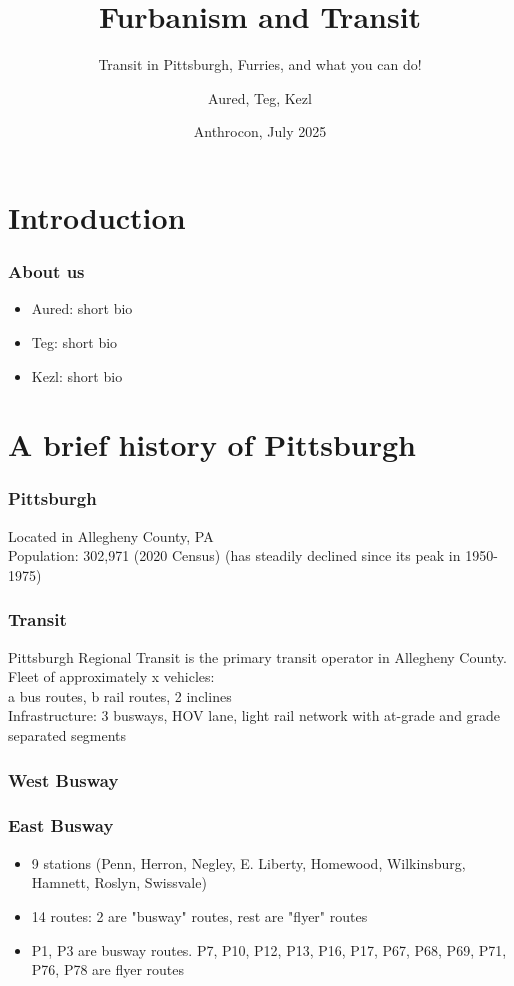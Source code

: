 \documentclass{beamer}
\title[Introduction]{Furbanism and Transit}
\subtitle{Transit in Pittsburgh, Furries, and what you can do!}
\author{Aured, Teg, Kezl}
\date[Anthrocon 2025]{Anthrocon, July 2025}
\begin{document}
\frame{\titlepage}

\section{Introduction} 

\begin{frame}
\frametitle{About us}
\begin{itemize}
    \item Aured: short bio %
    \item Teg: short bio %
    \item Kezl: short bio %
\end{itemize}
\end{frame}

\section{A brief history of Pittsburgh}

\begin{frame}
\frametitle{Pittsburgh}
Located in Allegheny County, PA \\
Population: 302,971 (2020 Census) (has steadily declined since its peak in 1950-1975) \\
\end{frame}

\begin{frame}
\frametitle{Transit}
Pittsburgh Regional Transit is the primary transit operator in Allegheny County. \\
Fleet of approximately x vehicles: \\
a bus routes, b rail routes, 2 inclines \\
Infrastructure: 3 busways, HOV lane, light rail network with at-grade and grade separated segments
\end{frame}

\begin{frame}
\frametitle{West Busway}
\end{frame}

\begin{frame}
\frametitle{East Busway}
\begin{itemize}
    \item 9 stations (Penn, Herron, Negley, E. Liberty, Homewood, Wilkinsburg, Hamnett, Roslyn, Swissvale)
    \item 14 routes: 2 are "busway" routes, rest are "flyer" routes 
    \item P1, P3 are busway routes. P7, P10, P12, P13, P16, P17, P67, P68, P69, P71, P76, P78 are flyer routes
\end{itemize}

\end{frame}
\end{document}
